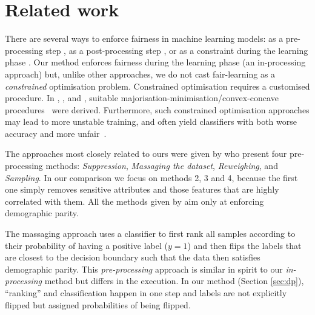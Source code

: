 \section{Related work}\label{sec:relatedwork}
There are several ways to enforce fairness in machine learning models:
as a pre-processing step
\citep{kamiran2012data,louizos2015variational,lum2016statistical,zemel2013learning,Chiappa19,QuaShaTho19},
as a post-processing step \citep{feldman2015certifying,hardt2016equality}, %
 or as a constraint during the learning phase
\citep{calders2009building,zafar2017fairnesstreatment,zafar2017fairnessconstraints,DonOneBenShaetal18,DimLiuParRad19}.
%
Our method enforces fairness during the learning phase (an in-processing approach) but, unlike other approaches, we do not cast fair-learning as a \emph{constrained} optimisation problem.
Constrained optimisation requires a customised procedure.
%
In \citet{GohCotGupFri16}, \citet{zafar2017fairnesstreatment}, and \citet{zafar2017fairnessconstraints},
suitable majorisation-minimisation/convex-concave procedures~\citep{LanSri09} were derived.
%
Furthermore, such constrained optimisation approaches may lead to more unstable training,
and often yield classifiers with both worse accuracy and more unfair~\citep{CotJiaWanNar18}.

The approaches most closely related to ours were given by \citet{kamiran2012data} who present four pre-processing methods:
\emph{Suppression}, \emph{Massaging the dataset}, \emph{Reweighing}, and \emph{Sampling}.
In our comparison we focus on methods 2, 3 and 4,
because the first one simply removes sensitive attributes and those features that are highly correlated with them.
All the methods given by \citet{kamiran2012data} aim only at enforcing demographic parity.

The massaging approach uses a classifier to first rank all samples according to their probability of having a positive label ($y=1$)
and then flips the labels that are closest to the decision boundary such that the data then satisfies demographic parity.
This \emph{pre-processing} approach is similar in spirit to our \emph{in-processing} method but differs in the execution.
In our method (Section \ref{sec:dp}), ``ranking'' and classification happen in one step and labels are not explicitly flipped
but assigned probabilities of being flipped.

